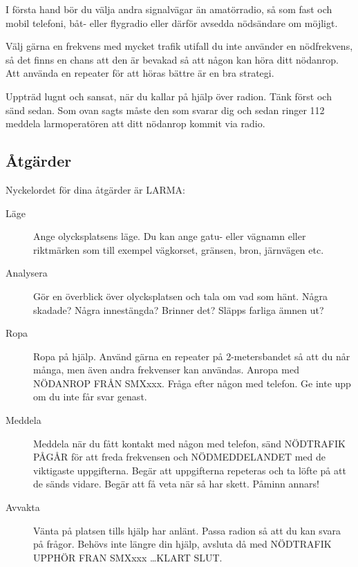 I första hand bör du välja andra signalvägar än amatörradio, så som fast och
mobil telefoni, båt- eller flygradio eller därför avsedda nödsändare om möjligt.

Välj gärna en frekvens med mycket trafik utifall du inte använder en
nödfrekvens, så det finns en chans att den är bevakad så att någon kan höra
ditt nödanrop.
Att använda en repeater för att höras bättre är en bra strategi.

Uppträd lugnt och sansat, när du kallar på hjälp över radion.
Tänk först och sänd sedan.
Som ovan sagts måste den som svarar dig och sedan ringer 112 meddela
larmoperatören att ditt nödanrop kommit via radio.

\subsection{Åtgärder}

Nyckelordet för dina åtgärder är LARMA:

\begin{description}
\item[Läge] Ange olycksplatsens läge. Du kan ange gatu- eller vägnamn eller riktmärken som
  till exempel vägkorset, gränsen, bron, järnvägen etc.
\item[Analysera] Gör en överblick över olycksplatsen och tala om vad som hänt.
  Några skadade? Några innestängda? Brinner det? Släpps farliga ämnen ut?
\item[Ropa] Ropa på hjälp. Använd gärna en repeater på 2-metersbandet så att du når många,
  men även andra frekvenser kan användas. Anropa med NÖDANROP FRÅN SMXxxx.
  Fråga efter någon med telefon. Ge inte upp om du inte får svar genast.
\item[Meddela] Meddela när du fått kontakt med någon med telefon, sänd NÖDTRAFIK PÅGÅR
  för att freda frekvensen och NÖDMEDDELANDET med de viktigaste uppgifterna.
  Begär att uppgifterna repeteras och ta löfte på att de sänds vidare.
  Begär att få veta när så har skett. Påminn annars!
\item[Avvakta] Vänta på platsen tills hjälp har anlänt.
  Passa radion så att du kan svara på frågor. Behövs inte längre din hjälp, avsluta då med
  NÖDTRAFIK UPPHÖR FRAN SMXxxx \dots KLART SLUT.
\end{description}
  
